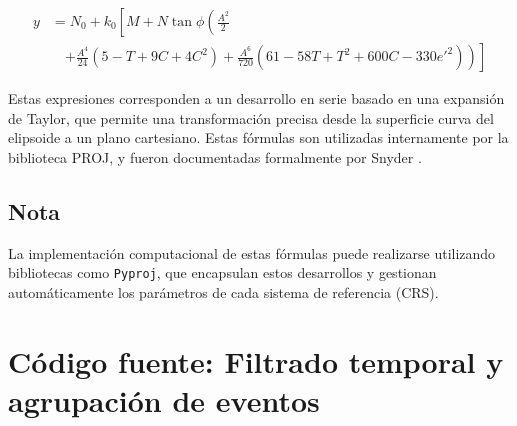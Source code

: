 \documentclass[12pt]{article}
\begin{document}
\begin{equation}
\begin{split}
y &= N_0 + k_0 \left[ M + N \tan \phi \left( \frac{A^2}{2} \right.\right. \\
&\quad \left.\left. + \frac{A^4}{24}(5 - T + 9C + 4C^2) + \frac{A^6}{720}(61 - 58T + T^2 + 600C - 330e'^2) \right) \right]
\end{split}
\end{equation}

Estas expresiones corresponden a un desarrollo en serie basado en una expansión de Taylor, que permite una transformación precisa desde la superficie curva del elipsoide a un plano cartesiano. Estas fórmulas son utilizadas internamente por la biblioteca PROJ, y fueron documentadas formalmente por Snyder \parencite{snyder1987}.

\subsection*{Nota}

La implementación computacional de estas fórmulas puede realizarse utilizando bibliotecas como \texttt{Pyproj}, que encapsulan estos desarrollos y gestionan automáticamente los parámetros de cada sistema de referencia (CRS).

\section{Código fuente: Filtrado temporal y agrupación de eventos}
\label{annex:filter_code}
\end{document}
